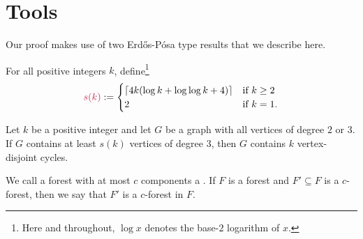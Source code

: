 \documentclass{patmorin}
\newcommand{\pat}[1]{\textcolor{Blue}{[Pat: #1]}}
\newcommand{\gwen}[1]{\textcolor{Purple}{Gwen: #1}}
\newcommand{\piotr}[1]{\textcolor{red}{Piotr: #1}}
\begin{document}





\section{Tools}

Our proof makes use of two Erd\H{o}s-Pósa type results that we describe here.

For all positive integers $k$, define\footnote{Here and throughout, $\log x$ denotes the base-$2$ logarithm of $x$.}
\[
\mathdefin{s(k)}:=\begin{cases}
\lceil 4k(\log k + \log\log k +4)\rceil&\textrm{if $k\geq2$}\\
2&\textrm{if $k=1$.}
\end{cases}
\]


\begin{thm}
\label{thm:simonovits}
Let $k$ be a positive integer and
let $G$ be a graph with all vertices of degree $2$ or $3$.
If $G$ contains at least $s(k)$ vertices of degree $3$, then
$G$ contains $k$ vertex-disjoint cycles.
\end{thm}

We call a forest with at most $c$ components a . If $F$ is a forest and $F'\subseteq F$ is a $c$-forest, then we say that $F'$ is a $c$-forest  in $F$.
\end{document}
